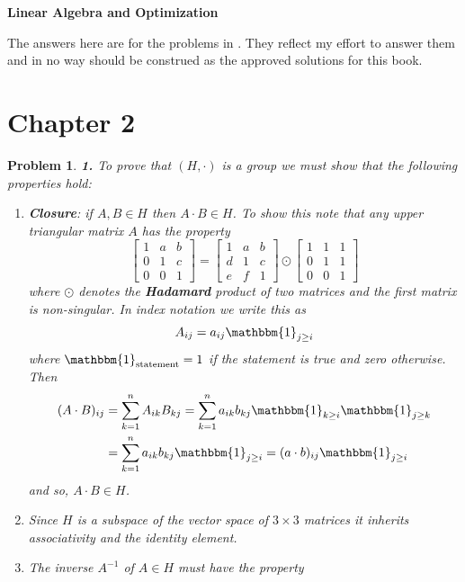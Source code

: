 \documentclass{article}
\theoremstyle{pprop}
\newtheorem{problem}{Problem}[section]
\begin{document}
\pagestyle{main}
\begin{center}
    \sffamily\LARGE\bfseries Linear Algebra and Optimization 
\end{center}
The answers here are for the problems in \citep{gallier2020linear}. 
They reflect my effort to answer them and in no way should be 
construed as the approved solutions for this book. 
\section*{Chapter 2}
\begin{problem}
\noindent\textbf{1.} To prove that $(H,\cdot)$ is a group we must show that the following properties hold:
\begin{enumerate}[(1)]
  \item \textbf{Closure}:  if $A,B \in {H}$ then $A \cdot B \in {H}$. To show this note that any upper triangular 
  matrix $A$ has the property
  \[
  \begin{bmatrix}
1 & a & b \\
0 & 1 & c \\
0 & 0 & 1
\end{bmatrix}
=
\begin{bmatrix}
1 & a & b \\
d & 1 & c \\
e & f & 1
\end{bmatrix}
\odot
\begin{bmatrix}
1 & 1 & 1 \\
0 & 1 & 1 \\
0 & 0 & 1
\end{bmatrix}
  \]
  where $\odot$ denotes the \textbf{Hadamard} product of two matrices and the first matrix is non-singular. In index notation we write this as 
  \[
  A_{ij} = a_{ij} \mathbbm{1}_{j \geq i}
  \]
  where $\mathbbm{1}_{\text{statement}}=1$ if the statement is true and zero otherwise. Then
\begin{align*}
(A \cdot B)_{ij}&=\sum_{k=1}^n A_{ik}B_{kj}=\sum_{k=1}^n a_{ik}b_{kj}
\mathbbm{1}_{k \geq i}\mathbbm{1}_{j \geq k} \\
& =\sum_{k=1}^n a_{ik}b_{kj}\mathbbm{1}_{j \geq i}
=(a \cdot b)_{ij}\mathbbm{1}_{j \geq i}
\end{align*}
and so, $A \cdot B \in {H}$.
\item Since $H$ is a subspace of the vector space of $3 \times 3$ matrices it inherits associativity and the identity element.
\item The inverse $A^{-1}$ of $A \in  H$ must have the property 

\end{enumerate}
\end{problem}
\end{document}
